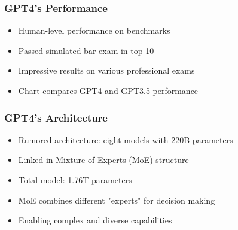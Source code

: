 \begin{frame}[fragile]\frametitle{GPT4's Performance}
    \begin{itemize}
        \item Human-level performance on benchmarks
        \item Passed simulated bar exam in top 10%
        \item Impressive results on various professional exams
        \item Chart compares GPT4 and GPT3.5 performance
    \end{itemize}
\end{frame}

\begin{frame}[fragile]\frametitle{GPT4's Architecture}
    \begin{itemize}
        \item Rumored architecture: eight models with 220B parameters
        \item Linked in Mixture of Experts (MoE) structure
        \item Total model: 1.76T parameters
        \item MoE combines different "experts" for decision making
        \item Enabling complex and diverse capabilities
    \end{itemize}
\end{frame}